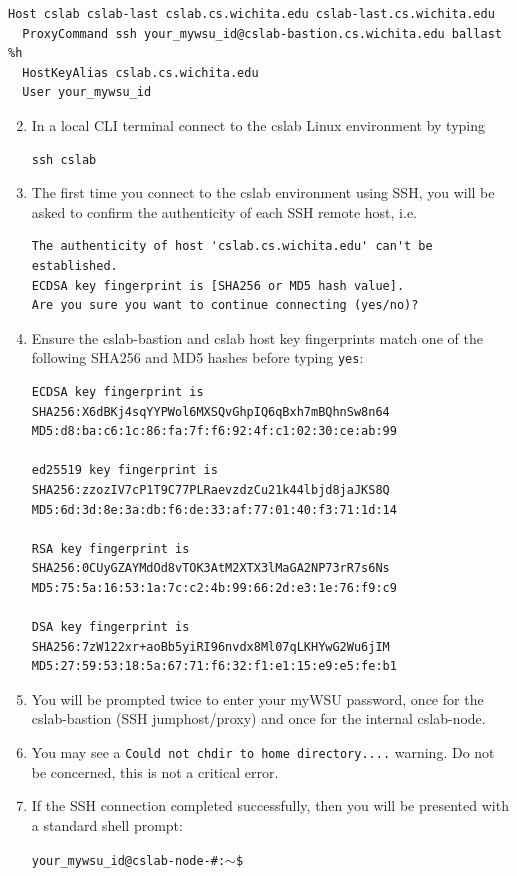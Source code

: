 \documentclass[12pt]{article}
\begin{document}
\begin{verbatim}
Host cslab cslab-last cslab.cs.wichita.edu cslab-last.cs.wichita.edu
  ProxyCommand ssh your_mywsu_id@cslab-bastion.cs.wichita.edu ballast %h
  HostKeyAlias cslab.cs.wichita.edu
  User your_mywsu_id
\end{verbatim}
\begin{enumerate}
\setcounter{enumi}{1}
\item In a local CLI terminal connect to the cslab Linux environment by typing
\begin{verbatim}
ssh cslab
\end{verbatim}
\item The first time you connect to the cslab environment using SSH, you will be asked to confirm the authenticity of each SSH remote host, i.e.
\begin{verbatim}
The authenticity of host 'cslab.cs.wichita.edu' can't be established.
ECDSA key fingerprint is [SHA256 or MD5 hash value].
Are you sure you want to continue connecting (yes/no)?
\end{verbatim}

\item Ensure the cslab-bastion and cslab host key fingerprints match one of the following SHA256 and MD5 hashes before typing \texttt{yes}:
\begin{verbatim}
ECDSA key fingerprint is
SHA256:X6dBKj4sqYYPWol6MXSQvGhpIQ6qBxh7mBQhnSw8n64
MD5:d8:ba:c6:1c:86:fa:7f:f6:92:4f:c1:02:30:ce:ab:99

ed25519 key fingerprint is
SHA256:zzozIV7cP1T9C77PLRaevzdzCu21k44lbjd8jaJKS8Q
MD5:6d:3d:8e:3a:db:f6:de:33:af:77:01:40:f3:71:1d:14

RSA key fingerprint is
SHA256:0CUyGZAYMdOd8vTOK3AtM2XTX3lMaGA2NP73rR7s6Ns
MD5:75:5a:16:53:1a:7c:c2:4b:99:66:2d:e3:1e:76:f9:c9

DSA key fingerprint is
SHA256:7zW122xr+aoBb5yiRI96nvdx8Ml07qLKHYwG2Wu6jIM
MD5:27:59:53:18:5a:67:71:f6:32:f1:e1:15:e9:e5:fe:b1
\end{verbatim}

\item You will be prompted twice to enter your myWSU password, once for the cslab-bastion (SSH jumphost/proxy) and once for the internal cslab-node.
\item You may see a \texttt{Could not chdir to home directory....} warning. Do not be concerned, this is not a critical error.
\item If the SSH connection completed successfully, then you will be presented with a standard shell prompt:

\texttt{your\_mywsu\_id@cslab-node-\#:$\sim$\$}
\end{enumerate}
\end{document}
